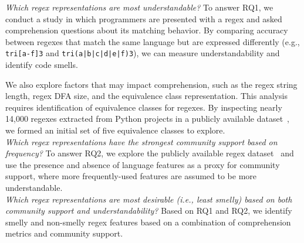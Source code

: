  {\em Which regex representations are most understandable?}
To answer RQ1, we conduct a study in which programmers are presented with a regex and asked comprehension questions about its matching behavior.  By comparing accuracy between regexes that match the same language but are expressed differently (e.g., \verb!tri[a-f]3! and \verb!tri(a|b|c|d|e|f)3!), we can measure understandability and identify code smells. 

We also explore factors that may impact comprehension, such as the regex string length, regex DFA size, and the equivalence class representation. 
This analysis requires identification of equivalence classes for regexes. By inspecting nearly 14,000 regexes extracted from Python projects in a publicly available dataset~\cite{chapman2016}, we formed an initial set of five equivalence classes to explore. \\

 {\em Which regex representations have the strongest {community support} based on  frequency?} %
To answer RQ2, we explore the publicly available regex dataset~\cite{chapman2016} and use the presence and absence of language features as a proxy for community support, where more frequently-used features are assumed to be more understandable.\\

  {\em Which regex representations are most desirable (i.e., least smelly) based on both community support and understandability?}
Based on RQ1 and RQ2, we identify smelly and non-smelly regex features based on a combination of comprehension metrics and community support. \\




%
%
%
%
%
%
%




